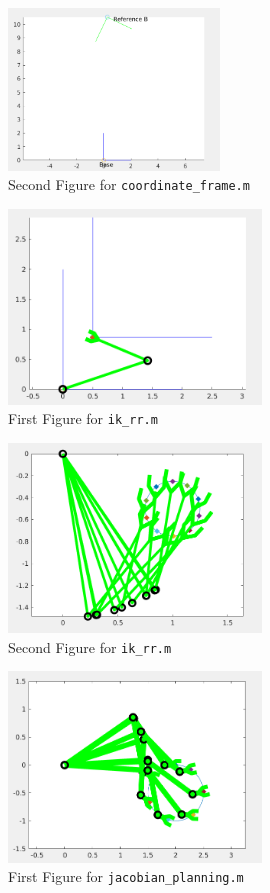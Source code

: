 \documentclass[letterpaper]{article}
\begin{document}
\begin{figure}[h]
  \centering
  \includegraphics[width=0.5\textwidth]{figs/coor-2.png}
  \caption{Second Figure for \texttt{coordinate\_frame.m}}
\end{figure}
\pagebreak
\begin{figure}[h]
  \centering
  \includegraphics[width=0.6\textwidth]{figs/ir-1.png}
  \caption{First Figure for \texttt{ik\_rr.m}}
\end{figure}
\begin{figure}[h]
  \centering
  \includegraphics[width=0.6\textwidth]{figs/ir-2.png}
  \caption{Second Figure for \texttt{ik\_rr.m}}
\end{figure}
\pagebreak
\begin{figure}[h]
  \centering
  \includegraphics[width=0.6\textwidth]{figs/jaco-1.png}
  \caption{First Figure for \texttt{jacobian\_planning.m}}
\end{figure}
\end{document}
